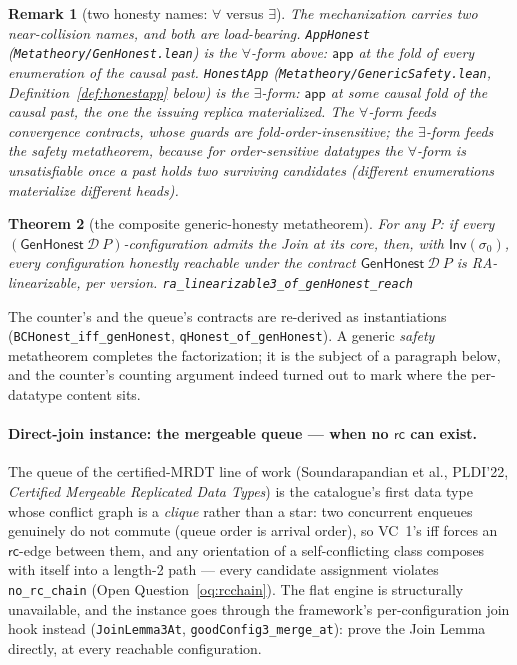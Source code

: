 \documentclass[11pt]{article}
\newtheorem{theorem}{Theorem}[section]
\newtheorem{remark}[theorem]{Remark}
\newcommand{\rcrel}{\mathsf{rc}}                 %
\newcommand{\Sinit}{\sigma_0}
\newcommand{\lean}[1]{\texttt{#1}}
\newcommand{\M}[1]{\mathcal{#1}}
\newcommand{\Inv}{\mathsf{Inv}}
\newcommand{\app}{\mathsf{app}}
\begin{document}
\begin{remark}[two honesty names: $\forall$ versus $\exists$]
\label{rem:honestnames}
The mechanization carries two near-collision names, and both are load-bearing.
\lean{AppHonest} (\lean{Metatheory/GenHonest.lean}) is the $\forall$-form above:
$\app$ at the fold of \emph{every} enumeration of the causal past.
\lean{HonestApp} (\lean{Metatheory/GenericSafety.lean},
Definition~\ref{def:honestapp} below) is the $\exists$-form: $\app$ at
\emph{some causal} fold of the causal past, the one the issuing replica
materialized. The $\forall$-form feeds convergence contracts, whose guards are
fold-order-insensitive; the $\exists$-form feeds the safety metatheorem, because for
order-sensitive datatypes the $\forall$-form is unsatisfiable once a past holds two
surviving candidates (different enumerations materialize different heads).
\end{remark}

\begin{theorem}[the composite generic-honesty metatheorem]
\label{thm:genhonest}
For any $P$: if every $(\mathsf{GenHonest}\ \M{D}\ P)$-configuration
admits the Join at its core, then, with $\Inv(\Sinit)$, every
configuration honestly reachable under the contract
$\mathsf{GenHonest}\ \M{D}\ P$ is RA-linearizable, per version.
\hfill\lean{ra\_linearizable3\_of\_genHonest\_reach}
\end{theorem}

The counter's and the queue's contracts are re-derived as instantiations
(\lean{BCHonest\_iff\_genHonest}, \lean{qHonest\_of\_genHonest}). A generic \emph{safety}
metatheorem completes the factorization; it is the subject of a
paragraph below, and the counter's counting argument indeed turned out
to mark where the per-datatype content sits.

\paragraph{Direct-join instance: the mergeable queue ---
when no $\rcrel$ can exist.} The queue of the certified-MRDT line of work
(Soundarapandian et al., PLDI'22, \emph{Certified Mergeable Replicated Data
Types}) is the catalogue's first data type whose conflict graph is a
\emph{clique} rather than a star: two concurrent enqueues genuinely do not
commute (queue order is arrival order), so VC~1's iff forces an $\rcrel$-edge
between them, and any orientation of a self-conflicting class composes with
itself into a length-2 path --- every candidate assignment violates
\lean{no\_rc\_chain} (Open Question~\ref{oq:rcchain}). The flat engine is
structurally unavailable, and the instance goes through the framework's
per-configuration join hook instead (\lean{JoinLemma3At},
\lean{goodConfig3\_merge\_at}): prove the Join Lemma directly, at every
reachable configuration.
\end{document}
